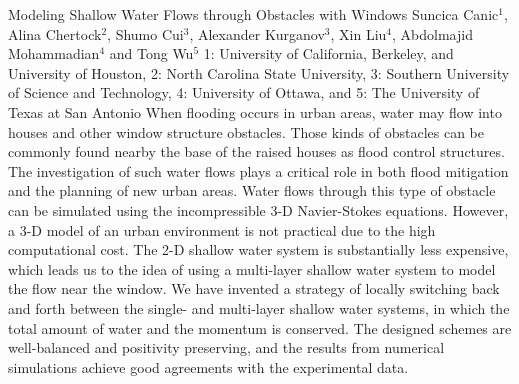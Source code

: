 \vspace{1.5ex}
\abs
{Modeling Shallow Water Flows through Obstacles with Windows}
{Suncica Canic$^{1}$, Alina Chertock$^{2}$, Shumo Cui$^{3}$, Alexander Kurganov$^{3}$, Xin Liu$^{4}$, Abdolmajid Mohammadian$^{4}$ and Tong Wu$^{5}$}
{1: University of California, Berkeley, and University of Houston, 2: North Carolina State University, 3: Southern University of Science and Technology, 4: University of Ottawa, and 5: The University of Texas at San Antonio}
{When flooding occurs in urban areas, water may flow into houses and other window structure obstacles. Those kinds of obstacles can be commonly found nearby the base of the raised houses as flood control structures. The investigation of such water flows plays a critical role in both flood mitigation and the planning of new urban areas. Water flows through this type of obstacle can be simulated using the incompressible 3-D Navier-Stokes equations. However, a 3-D model of an urban environment is not practical due to the high computational cost. The 2-D shallow water system is substantially less expensive, which leads us to the idea of using a multi-layer shallow water system to model the flow near the window. We have invented a strategy of locally switching back and forth between the single- and multi-layer shallow water systems, in which the total amount of water and the momentum is conserved. The designed schemes are well-balanced and positivity preserving, and the results from numerical simulations achieve good agreements with the experimental data.}



